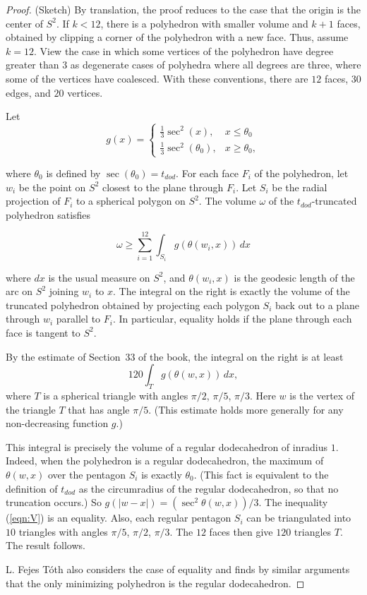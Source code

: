 \documentclass{article} %
\begin{document}
\begin{proof}
 (Sketch) By translation, the proof reduces to the case that the
origin is the center of $S^2$. If $k<12$, there is a polyhedron with
smaller volume and $k+1$ faces, obtained by clipping a corner of the
polyhedron with a new face. Thus, assume $k=12$. View the case in
which some vertices of the polyhedron have degree greater than $3$ as
degenerate cases of polyhedra where all degrees are three, where some
of the vertices have coalesced. With these conventions, there are $12$
faces, $30$ edges, and $20$ vertices.

Let 
  $$g(x) = \begin{cases}
             \frac13 \sec^2 (x), & x \le \theta_0\\
             \frac13 \sec^2 (\theta_0), & x \ge \theta_0,
           \end{cases}$$

where $\theta_0$ is defined by $\sec(\theta_0) = t_{dod}$. For each
face $F_i$ of the polyhedron, let $w_i$ be the point
on  $S^2$ closest to the plane through
$F_i$. Let $S_i$ be the radial projection of $F_i$ to a spherical
polygon on $S^2$. The volume $\omega$ of the $t_{dod}$-truncated
polyhedron satisfies

\begin{equation}\label{eqn:V}
  \omega \ge \sum_{i=1}^{12} \int_{S_i} g(\theta(w_i,x))\,dx
\end{equation}

where $dx$ is the usual measure on $S^2$, and $\theta(w_i,x)$ is the
geodesic length of the arc on $S^2$ joining $w_i$ to $x$. The integral
on the right is exactly the volume of the truncated polyhedron
obtained by projecting each polygon $S_i$ back out to a plane through $w_i$ parallel
to $F_i$.  In particular, equality holds if the plane through each face
is tangent to $S^2$.

By the estimate of Section~33 of the book, the integral on the right is
at least
$$
120 \int_{T} g(\theta(w,x))\, dx,
$$
where $T$ is a spherical triangle with angles $\pi/2$, $\pi/5$,
$\pi/3$. Here $w$ is the vertex of the triangle $T$ that has angle
$\pi/5$. (This estimate holds more generally for any non-decreasing function
$g$.)

This integral is precisely the volume of a regular dodecahedron of
inradius $1$. Indeed, when the polyhedron is a regular dodecahedron,
the maximum of $\theta(w,x)$ over the pentagon $S_i$ is exactly
$\theta_0$. (This fact is equivalent to the definition of $t_{dod}$ as
the circumradius of the regular dodecahedron, so that no truncation
occurs.) So $g(|w-x|) = (\sec^2\theta(w,x))/3$. The inequality
(\ref{eqn:V}) is an equality. Also, each regular pentagon $S_i$ can be
triangulated into $10$ triangles with angles $\pi/5$, $\pi/2$,
$\pi/3$. The $12$ faces then give $120$ triangles $T$. The result
follows.

L. Fejes T\'oth also considers the case of equality and finds by similar
arguments that the
only minimizing polyhedron is the regular dodecahedron.
\end{proof}
\end{document}
